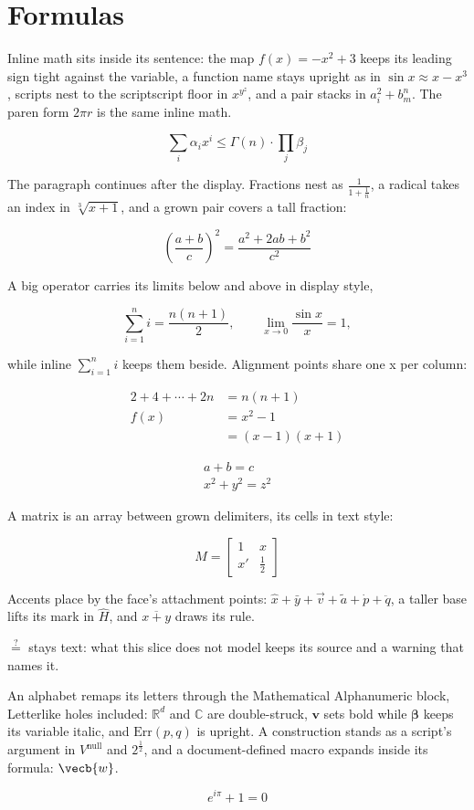 \documentclass{article}
\begin{document}
\section{Formulas}

Inline math sits inside its sentence: the map $f(x) = -x^2 + 3$ keeps its
leading sign tight against the variable, a function name stays upright as
in $\sin x \approx x - x^3$, scripts nest to the scriptscript floor in
$x^{y^z}$, and a pair stacks in $a_i^2 + b^{n}_{m}$. The paren form
\(2\pi r\) is the same inline math.

\[ \sum_i \alpha_i x^i \le \Gamma(n) \cdot \prod_j \beta_j \]

The paragraph continues after the display. Fractions nest as
$\frac{1}{1 + \frac{1}{n}}$, a radical takes an index in $\sqrt[3]{x + 1}$,
and a grown pair covers a tall fraction:

\[ \left( \frac{a + b}{c} \right)^2 = \frac{a^2 + 2ab + b^2}{c^2} \]

A big operator carries its limits below and above in display style,

\[ \sum_{i=1}^{n} i = \frac{n(n+1)}{2}, \qquad \lim_{x \to 0} \frac{\sin x}{x} = 1, \]

while inline $\sum_{i=1}^{n} i$ keeps them beside. Alignment points share
one x per column:

\begin{align*}
  2 + 4 + \cdots + 2n &= n(n+1) \\
  f(x) &= x^2 - 1 \\
       &= (x-1)(x+1)
\end{align*}

\begin{gather*}
  a + b = c \\
  x^2 + y^2 = z^2
\end{gather*}

A matrix is an array between grown delimiters, its cells in text style:

\[ M = \left[ \begin{array}{cc} 1 & x \\ x' & \frac{1}{2} \end{array} \right] \]

Accents place by the face's attachment points: $\hat{x} + \bar{y} +
\vec{v} + \tilde{a} + \dot{p} + \ddot{q}$, a taller base lifts its mark in
$\hat{H}$, and $\overline{x + y}$ draws its rule.

$\overset{?}{=}$ stays text: what this slice does not model keeps its
source and a warning that names it.

An alphabet remaps its letters through the Mathematical Alphanumeric
block, Letterlike holes included: $\mathbb{R}^{d}$ and $\mathbb{C}$ are
double-struck, $\mathbf{v}$ sets bold while $\boldsymbol{\beta}$ keeps its
variable italic, and
$\mathrm{Err}(p, q)$ is upright. A construction stands as a script's
argument in $V^\text{null}$ and $2^\frac{1}{2}$, and a document-defined
macro expands inside its formula: $\vecb{w}$.

\begin{equation*}
  e^{i\pi} + 1 = 0
\end{equation*}
\end{document}
